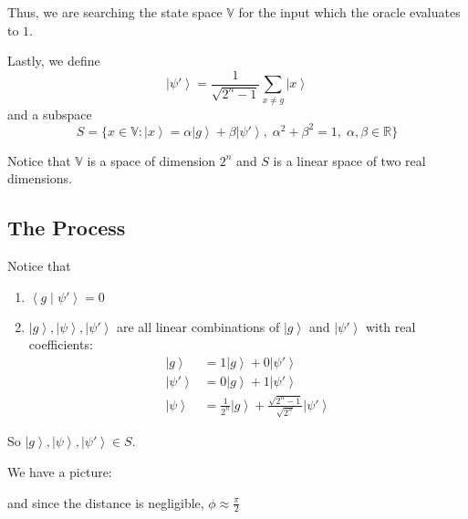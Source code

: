 \documentclass[12pt]{article}
\newcommand{\R}{\mathbb{R}}
\newcommand{\brak}[1]{\left\langle #1 \right\rangle}
\newcommand{\ket}[1]{\left\vert #1 \right\rangle}
\begin{document}
        Thus, we are searching the state space $\mathbb{V}$ for the input which the oracle evaluates to $1$.

        Lastly, we define 
        \[\ket{\psi'} = \frac{1}{\sqrt{2^{n}-1}}\sum_{x \neq g} \ket{x}\] 
        and a subspace 
        \[S = \{x\in \mathbb{V}: \ket{x} = \alpha \ket{g} + \beta \ket{\psi'},\; \alpha^2 + \beta^2 = 1, \; \alpha, \beta \in \R\}\]

        Notice that $\mathbb{V}$ is a space of dimension $2^n$ and $S$ is a linear space of two real dimensions.  
    \subsection*{The Process}
        Notice that
        \begin{enumerate}
            \item $\brak{g \; | \; \psi'} = 0$
            \item $\ket{g}, \ket{\psi}, \ket{\psi'}$ are all linear combinations of $\ket{g}$ and $\ket{\psi'}$ with real coefficients:
            \begin{align*}
                \ket{g} &= 1 \ket{g} + 0\ket{\psi'}\\ 
                \ket{\psi'} &= 0\ket{g} + 1\ket{\psi'}\\ 
                \ket{\psi} &= \frac{1}{2^n}\ket{g} + \frac{\sqrt{2^n -1}}{\sqrt{2^n}}\ket{\psi'}
            \end{align*}
        \end{enumerate}

        So $\ket{g}, \ket{\psi}, \ket{\psi'} \in S$. 

        We have a picture: 
        \usetikzlibrary{angles,quotes}
        \begin{center}
        \end{center}
        and since the distance is negligible, $\phi \approx \frac{\pi}{2}$
\end{document}
